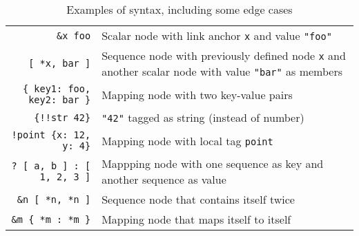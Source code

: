 \begin{table}
\begin{tabularx}{\textwidth}{rX}
 \verb|&x foo| & 
    Scalar node with link anchor \texttt{x} and value \texttt{"foo"} \\
 \verb|[ *x, bar ]| & Sequence node with previously defined node
    \texttt{x} and another scalar node with value \texttt{"bar"} as members \\
 \verb|{ key1: foo, key2: bar }| & Mapping node with two key-value pairs \\
 \verb|{!!str 42}|               & 
    \texttt{"42"} tagged as string (instead of number) \\
 \verb|!point {x: 12, y: 4}|     & Mapping node with local tag \texttt{point} \\
 \verb|? [ a, b ] : [ 1, 2, 3 ]| & Mappping node with one sequence as
    key and another sequence as value \\
 \verb|&n [ *n, *n ]| & Sequence node that contains itself twice \\
 \verb|&m { *m : *m }| & Mapping node that maps itself to itself \\
\end{tabularx}
\caption{Examples of  syntax, including some edge cases}
\label{fig:yamlsyntax}
\end{table}





% 

